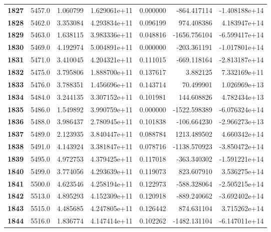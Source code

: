 \documentclass{report}[12pt]
\begin{document}
\begin{center}
\begin{tabular}{lrrrrrr}
\textbf{1827} &         5457.0 &   1.060799 &  1.629061e+11 &    0.000000 &  -864.417114 & -1.408188e+14 \\
\textbf{1828} &         5462.0 &   3.353084 &  4.293834e+11 &    0.096199 &   974.408386 &  4.183947e+14 \\
\textbf{1829} &         5463.0 &   1.638115 &  3.983336e+11 &    0.048816 & -1656.756104 & -6.599417e+14 \\
\textbf{1830} &         5469.0 &   4.192974 &  5.004891e+11 &    0.000000 &  -203.361191 & -1.017801e+14 \\
\textbf{1831} &         5471.0 &   3.410045 &  4.204321e+11 &    0.111015 &  -669.118164 & -2.813187e+14 \\
\textbf{1832} &         5475.0 &   3.795806 &  1.888700e+11 &    0.137617 &     3.882125 &  7.332169e+11 \\
\textbf{1833} &         5476.0 &   3.788351 &  1.456696e+11 &    0.143714 &    70.499901 &  1.026969e+13 \\
\textbf{1834} &         5484.0 &   3.244135 &  3.307152e+11 &    0.101981 &   144.608826 &  4.782434e+13 \\
\textbf{1835} &         5486.0 &   1.549892 &  3.990759e+11 &    0.000000 & -1522.598389 & -6.076324e+14 \\
\textbf{1836} &         5488.0 &   3.986437 &  2.780945e+11 &    0.101838 &  -106.664230 & -2.966273e+13 \\
\textbf{1837} &         5489.0 &   2.123935 &  3.840447e+11 &    0.088784 &  1213.489502 &  4.660342e+14 \\
\textbf{1838} &         5491.0 &   4.143924 &  3.381847e+11 &    0.078716 & -1138.570923 & -3.850472e+14 \\
\textbf{1839} &         5495.0 &   4.972753 &  4.379425e+11 &    0.117018 &  -363.340302 & -1.591221e+14 \\
\textbf{1840} &         5499.0 &   3.774056 &  4.293639e+11 &    0.119073 &   823.607910 &  3.536275e+14 \\
\textbf{1841} &         5500.0 &   4.623546 &  4.258194e+11 &    0.122973 &  -588.328064 & -2.505215e+14 \\
\textbf{1842} &         5513.0 &   4.895293 &  4.152309e+11 &    0.120918 &  -889.240662 & -3.692402e+14 \\
\textbf{1843} &         5515.0 &   4.485685 &  4.247805e+11 &    0.126442 &   874.631104 &  3.715262e+14 \\
\textbf{1844} &         5516.0 &   1.836774 &  4.147414e+11 &    0.102262 & -1482.131104 & -6.147011e+14 \\

\end{tabular}
\end{center}
\end{document}
